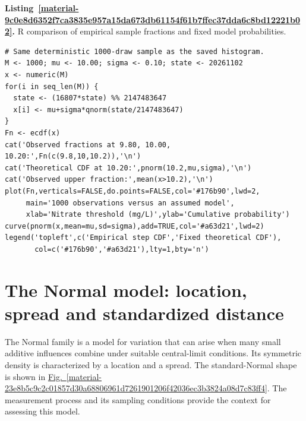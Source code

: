 \documentclass[11pt,a4paper]{article}
\newcounter{listing}
\begin{document}
\par\medskip
{}
\label{material-9c0e8d6352f7ca3835e957a15da673db61154f61b7ffec37dda6c8bd12221b02}
\noindent\textbf{Listing~\ref*{material-9c0e8d6352f7ca3835e957a15da673db61154f61b7ffec37dda6c8bd12221b02}.} R comparison of empirical sample fractions and fixed model probabilities.\par\nopagebreak
\begin{Verbatim}[fontsize=\footnotesize,breaklines=true,breakanywhere=true]
# Same deterministic 1000-draw sample as the saved histogram.
M <- 1000; mu <- 10.00; sigma <- 0.10; state <- 20261102
x <- numeric(M)
for(i in seq_len(M)) {
  state <- (16807*state) %% 2147483647
  x[i] <- mu+sigma*qnorm(state/2147483647)
}
Fn <- ecdf(x)
cat('Observed fractions at 9.80, 10.00, 10.20:',Fn(c(9.8,10,10.2)),'\n')
cat('Theoretical CDF at 10.20:',pnorm(10.2,mu,sigma),'\n')
cat('Observed upper fraction:',mean(x>10.2),'\n')
plot(Fn,verticals=FALSE,do.points=FALSE,col='#176b90',lwd=2,
     main='1000 observations versus an assumed model',
     xlab='Nitrate threshold (mg/L)',ylab='Cumulative probability')
curve(pnorm(x,mean=mu,sd=sigma),add=TRUE,col='#a63d21',lwd=2)
legend('topleft',c('Empirical step CDF','Fixed theoretical CDF'),
       col=c('#176b90','#a63d21'),lty=1,bty='n')

\end{Verbatim}

\medskip

\clearpage
\section{The Normal model: location, spread and standardized distance}
The Normal family is a model for variation that can arise when many small additive influences combine under suitable central-limit conditions. Its symmetric density is characterized by a location and a spread. The standard-Normal shape is shown in \hyperref[material-23e8b5c9c2c01857d30a68806961d7261901206f42036ec3b3824a08d7c83ff4]{Fig.~\ref*{material-23e8b5c9c2c01857d30a68806961d7261901206f42036ec3b3824a08d7c83ff4}}. The measurement process and its sampling conditions provide the context for assessing this model.
\end{document}
